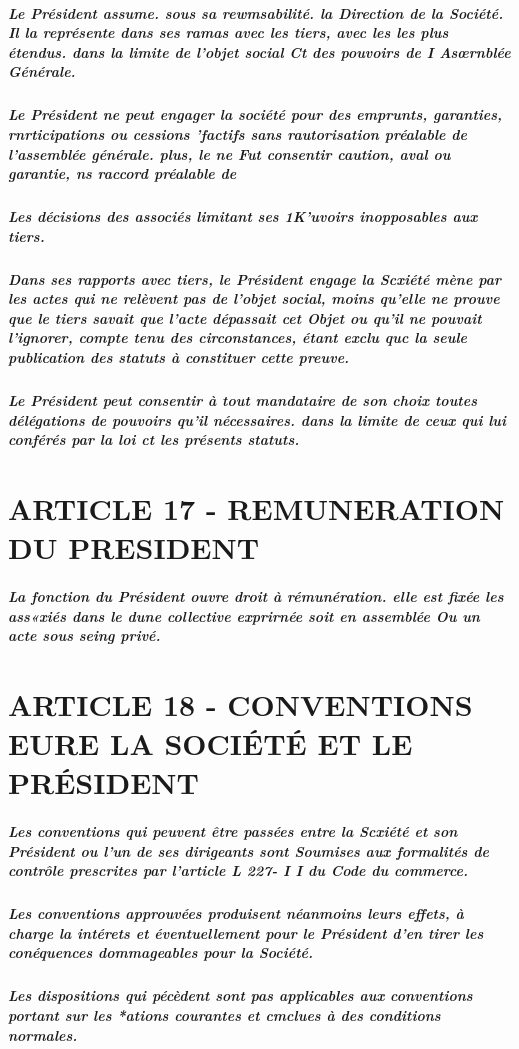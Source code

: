 \documentclass[a4paper, 11pt]{article}
\begin{document}
\subparagraph{
  Le Président assume. sous sa rewmsabilité. la Direction de la Société. Il la représente dans ses ramas avec les tiers, avec les les plus étendus. dans la limite de l'objet social Ct des pouvoirs de I  Asœrnblée Générale.
}

\subparagraph{
  Le Président ne peut engager la société pour des emprunts, garanties, rnrticipations ou cessions 'factifs sans rautorisation préalable de l'assemblée générale. plus, le ne Fut consentir caution, aval ou garantie, ns raccord préalable de
}

\subparagraph{
  Les décisions des associés limitant ses 1K'uvoirs inopposables aux tiers.
}

\subparagraph{
  Dans ses rapports avec tiers, le Président engage la Scxiété mène par les actes qui ne relèvent pas de l'objet social, moins qu'elle ne prouve que le tiers savait que l'acte dépassait cet Objet ou qu'il ne pouvait l'ignorer, compte tenu des circonstances, étant exclu quc la seule publication des statuts à constituer cette preuve.
}

\subparagraph{
  Le Président peut consentir à tout mandataire de son choix toutes délégations de pouvoirs qu'il nécessaires. dans la limite de ceux qui lui conférés par la loi ct les présents statuts.
}

\section*{ARTICLE 17 - REMUNERATION DU PRESIDENT}

\subparagraph{
  La fonction du Président ouvre droit à rémunération. elle est fixée les ass«xiés dans le dune collective exprirnée soit en assemblée Ou un acte sous seing privé.
}

\section*{ARTICLE 18 - CONVENTIONS EURE LA SOCIÉTÉ ET LE PRÉSIDENT}

\subparagraph{
  Les conventions qui peuvent être passées entre la Scxiété et son Président ou l'un de ses dirigeants sont Soumises aux formalités de contrôle prescrites par l'article L 227- I I du Code du commerce.
}

\subparagraph{
  Les conventions approuvées produisent néanmoins leurs effets, à charge la intérets et éventuellement pour le Président d'en tirer les conéquences dommageables pour la Société.
}

\subparagraph{
  Les dispositions qui pécèdent sont pas applicables aux conventions portant sur les *ations courantes et cmclues à des conditions normales.
}
\end{document}

